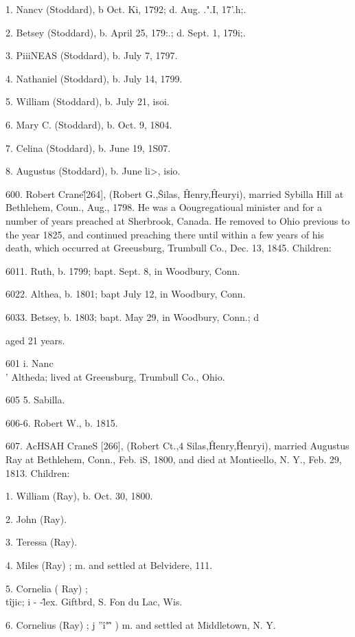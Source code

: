 \documentclass{book}
\begin{document}
1. Nancv (Stoddard), b Oct. Ki, 1792; d. Aug. .".I, 17'.h;. 

2. Betsey (Stoddard), b. April 25, 179:.; d. Sept. 1, 179i;. 

3. PiiiNEAS (Stoddard), b. July 7, 1797. 

4. Nathaniel (Stoddard), b. July 14, 1799. 

5. William (Stoddard), b. July 21, isoi. 

6. Mary C. (Stoddard), b. Oct. 9, 1804. 

7. Celina (Stoddard), b. June 19, 1S07. 

8. Augustus (Stoddard), b. June li>, isio. 




600. Robert Crane\^ [264], (Robert G.,\^ Silas, \^ Henry,\^ 
Heuryi), married Sybilla Hill at Bethlehem, Coun., Aug., 1798. 
He was a Oougregatioual minister and for a number of years 
preached at Sherbrook, Canada. He removed to Ohio previous 
to the year 1825, and continued preaching there until within a 
few years of his death, which occurred at Greeusburg, Trumbull 
Co., Dec. 13, 1845. Children: 

6011. Ruth, b. 1799; bapt. Sept. 8, in Woodbury, Conn. 

6022. Althea, b. 1801; bapt July 12, in Woodbury, Conn. 

6033. Betsey, b. 1803; bapt. May 29, in Woodbury, Conn.; d 

aged 21 years. 

601 i. Nanc\\' Altheda; lived at Greeusburg, Trumbull Co., Ohio. 

605  5. Sabilla. 

606-6. Robert W., b. 1815. 



607. AcHSAH CraneS [266], (Robert Ct.,4 Silas,\^ Henry,\^ 
Henryi), married Augustus Ray at Bethlehem, Conn., Feb. iS, 
1800, and died at Montieello, N. Y., Feb. 29, 1813. Children: 

1. William (Ray), b. Oct. 30, 1800. 

2. John (Ray). 

3. Teressa (Ray). 

4. Miles (Ray) ; m. and settled at Belvidere, 111. 

5. Cornelia ( Ray) ; \\ t\^ijic; i - -\^lex. Giftbrd, S. Fon du Lac, Wis. 

6. Cornelius (Ray) ; j ''\^i"\^' ) m. and settled at Middletown, N. Y. 
\end{document}
